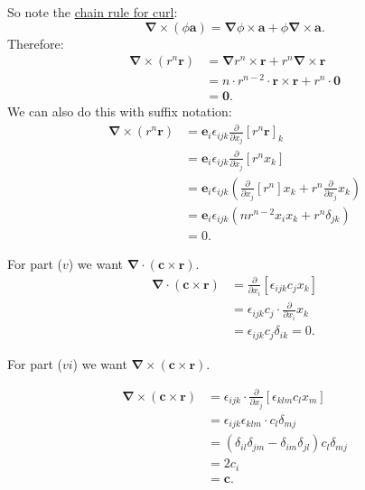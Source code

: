 \begin{enumerate}
    So note the \underline{chain rule for curl}:
    $$\boldsymbol{\nabla}\times(\phi\boldsymbol{a})=
    \boldsymbol{\nabla}\phi\times\boldsymbol{a}
    +\phi\boldsymbol{\nabla}\times\boldsymbol{a}.$$
    Therefore:
    \begin{align*}
        \boldsymbol{\nabla}\times(r^n\boldsymbol{r})
        &=\boldsymbol{\nabla}r^n\times\boldsymbol{r}
        +r^n\boldsymbol{\nabla}\times\boldsymbol{r} \\
        &=n\cdot r^{n-2}\cdot\boldsymbol{r}\times\boldsymbol{r}
        +r^n\cdot\boldsymbol{0} \\
        &=\boldsymbol{0}.
    \end{align*}
    We can also do this with suffix notation:
    \begin{align*}
        \boldsymbol{\nabla}\times(r^n\boldsymbol{r})
        &=\boldsymbol{e}_i\epsilon_{ijk}\frac{\partial}{\partial x_j}
        [r^n\boldsymbol{r}]_k \\
        &=\boldsymbol{e}_i\epsilon_{ijk}\frac{\partial}{\partial x_j}
        [r^n x_k] \\
        &=\boldsymbol{e}_i\epsilon_{ijk}\left(
            \frac{\partial}{\partial x_j}
        [r^n] x_k+r^n\frac{\partial}{\partial x_j}x_k
        \right) \\
        &=\boldsymbol{e}_i\epsilon_{ijk}\left(
            nr^{n-2}x_i x_k+r^n\delta_{jk}
        \right) \\
        &=0.
    \end{align*}

    For part ($v$) we want $\boldsymbol{\nabla}\cdot
    (\boldsymbol{c}\times\boldsymbol{r})$.
    \begin{align*}
        \boldsymbol{\nabla}\cdot(\boldsymbol{c}\times\boldsymbol{r})
        &=\frac{\partial}{\partial x_i}[\epsilon_{ijk}c_jx_k] \\
        &=\epsilon_{ijk}c_j\cdot\frac{\partial}{\partial x_i}x_k \\
        &=\epsilon_{ijk}c_j\delta_{ik}
        =0.
    \end{align*}

    For part ($vi$) we want $\boldsymbol{\nabla}\times
    (\boldsymbol{c}\times\boldsymbol{r})$.

    \begin{align*}
        \boldsymbol{\nabla}\times(\boldsymbol{c}\times\boldsymbol{r})
        &=\epsilon_{ijk}\cdot\frac{\partial}{\partial x_j}[\epsilon_{klm}c_lx_m] \\
        &=\epsilon_{ijk}\epsilon_{klm}\cdot c_l\delta_{mj} \\
        &=(\delta_{il}\delta_{jm}-\delta_{im}\delta_{jl})c_l\delta_{mj} \\
        &=2c_i \\
        &=\boldsymbol{c}.
    \end{align*}


\end{enumerate}
